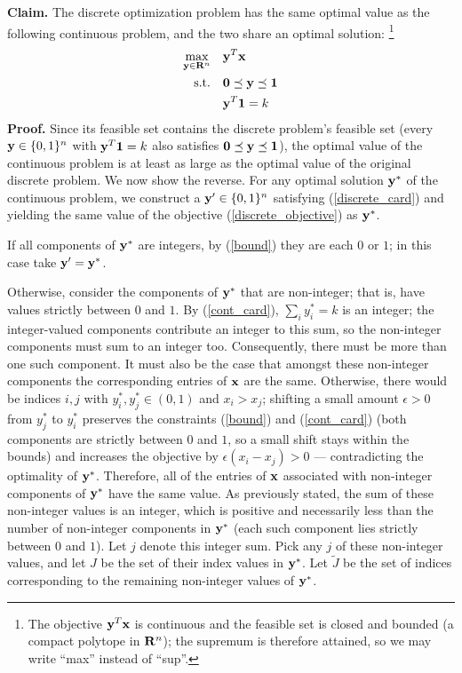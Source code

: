 \documentclass[12pt]{article}
\begin{document}
\textbf{Claim.} The discrete optimization problem has the same optimal value as the following continuous problem, and the two share an optimal solution:%
\footnote{%
The objective ${\bf y}^T {\bf x}$ is continuous and the feasible set is closed and bounded
(a compact polytope in ${\bf R}^n$); the supremum is therefore attained, so we may
write ``max'' instead of ``sup''.
}
\begin{align}
	\max_{{\bf y} \in {\bf R}^n} \quad & {\bf y}^T {\bf x} \notag \\
	\text{s.t.} \quad & {\bf 0} \preceq {\bf y} \preceq {\bf 1} \label{bound} \\
	& {\bf y}^T {\bf 1} = k \label{cont_card}
\end{align}
\textbf{Proof.}
Since its feasible set contains the discrete problem's feasible set
(every ${\bf y} \in \{0,1\}^n$ with ${\bf y}^T {\bf 1} = k$ also satisfies
${\bf 0} \preceq {\bf y} \preceq {\bf 1}$), the optimal value of the continuous problem is
at least as large as the optimal value of the original discrete problem.
We now show the reverse. For any optimal solution ${\bf y}^*$ of the continuous
problem, we construct a ${\bf y}^\prime \in \{0,1\}^n$ satisfying
(\ref{discrete_card}) and yielding the same value of the objective
(\ref{discrete_objective}) as ${\bf y}^*$.

If all components of ${\bf y}^*$ are integers, by (\ref{bound}) they are each
$0$ or $1$; in this case take ${\bf y}^\prime = {\bf y}^*$.

Otherwise, consider the components of ${\bf y}^*$
that are non-integer; that is, have values strictly between $0$ and $1$.
By (\ref{cont_card}), $\sum_i y^*_i = k$ is an integer; the integer-valued
components contribute an integer to this sum, so the non-integer components
must sum to an integer too. Consequently, there must be more than one such
component. It must also be the case that amongst these non-integer components
the corresponding entries of ${\bf x}$ are the same. Otherwise, there would
be indices $i, j$ with $y^*_i, y^*_j \in (0,1)$ and $x_i > x_j$; shifting a
small amount $\epsilon > 0$ from $y^*_j$ to $y^*_i$ preserves the
constraints (\ref{bound}) and (\ref{cont_card}) (both components are
strictly between $0$ and $1$, so a small shift stays within the bounds) and
increases the objective by $\epsilon (x_i - x_j) > 0$ --- contradicting the
optimality of ${\bf y}^*$. Therefore, all of the entries of ${\bf x}$
associated with non-integer components of ${\bf y}^*$ have the same
value. As previously stated, the sum of these non-integer values is an integer,
which is positive and necessarily less than the number of non-integer
components in ${\bf y}^*$ (each such component lies strictly between $0$ and $1$).
Let $j$ denote this integer sum.
Pick any $j$ of these non-integer values, and let $J$ be the set of their index
values in ${\bf y}^*$.
Let ${\tilde J}$ be the set of indices corresponding to the remaining non-integer values
of ${\bf y}^*$.
\end{document}
